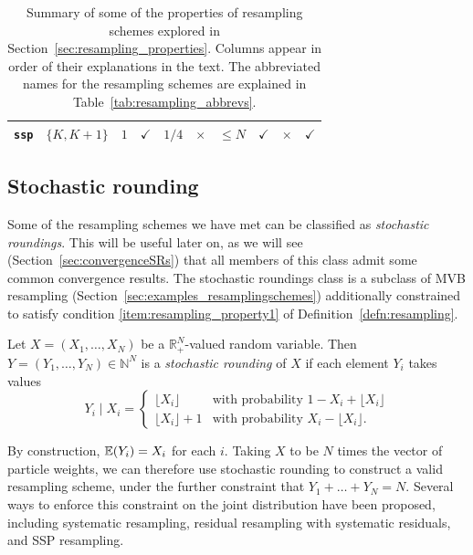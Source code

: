 \begin{landscape}
\begin{table}[ht]
\begin{tabular}{ l | c c c c c c c c c }
\texttt{ssp} & $\{K, K+1\}$ & $1$ & $\checkmark$ & $1/4$
        & $\times$ & $\leq N$ & $\checkmark$ & $\times$ & $\checkmark$ \\
\hline\hline
\end{tabular}
\caption[Properties of resampling schemes]{Summary of some of the properties of resampling schemes explored in Section~\ref{sec:resampling_properties}. 
Columns appear in order of their explanations in the text.
The abbreviated names for the resampling schemes are explained in Table~\ref{tab:resampling_abbrevs}.}
\label{tab:resampling_properties}
\end{table} 
\end{landscape}
 
 
 

\subsection{Stochastic rounding}
\label{sec:SRs}
Some of the resampling schemes we have met can be classified as \emph{stochastic roundings}. This will be useful later on, as we will see (Section~\ref{sec:convergenceSRs}) that all members of this class admit some common convergence results.
The stochastic roundings class is a subclass of MVB resampling (Section~\ref{sec:examples_resamplingschemes}) additionally constrained to satisfy condition \ref{item:resampling_property1} of Definition~\ref{defn:resampling}.

\begin{defn}\label{defn:stochround}
 Let $X=(X_1,\dots,X_N)$ be a $\mathbb{R}_+^N$-valued random variable. Then $Y=(Y_1,\dots,Y_N) \in \mathbb{N}^N$ is a \emph{stochastic rounding} of $X$ if each element $Y_i$ takes values
\begin{equation*}
Y_i \mid X_i =
\begin{cases}
 \lfloor X_i \rfloor & \text{with probability } 1- X_i+ \lfloor X_i \rfloor \\
  \lfloor X_i \rfloor +1 & \text{with probability } X_i- \lfloor X_i \rfloor .
\end{cases}
\end{equation*}
\end{defn}

By construction, $\mathbb{E}(Y_i) = X_i$ for each $i$. Taking $X$ to be $N$ times the vector of particle weights, we can therefore use stochastic rounding to construct a valid resampling scheme, under the further constraint that $Y_1 + \dots + Y_N = N$.
Several ways to enforce this constraint on the joint distribution have been proposed, including systematic resampling, residual resampling with systematic residuals, and SSP resampling.

